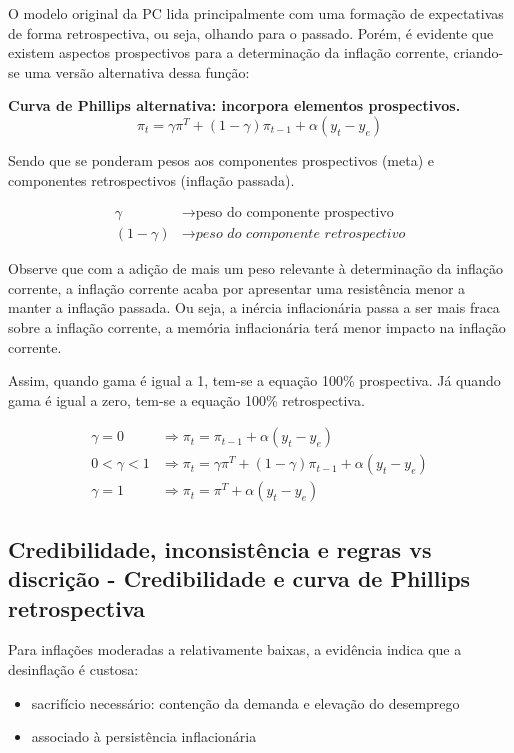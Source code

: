 \documentclass[a4paper,12pt]{article}[abntex2]
\begin{document}
O modelo original da PC lida principalmente com uma formação de expectativas de forma retrospectiva, ou seja, olhando para o passado. Porém, é evidente que existem aspectos prospectivos para a determinação da inflação corrente, criando-se uma versão alternativa dessa função:

\textbf{Curva de Phillips alternativa: incorpora elementos prospectivos.}
\begin{equation}
\pi_t = \gamma \pi^T + (1 - \gamma)\pi_{t-1} + \alpha (y_t - y_e)
\end{equation}

Sendo que se ponderam pesos aos componentes prospectivos (meta) e componentes retrospectivos (inflação passada).

\begin{align*}
\gamma &\rightarrow \text{peso do componente prospectivo} \\
(1 - \gamma) &\rightarrow \textit{peso do componente retrospectivo}
\end{align*}

Observe que com a adição de mais um peso relevante à determinação da inflação corrente, a inflação corrente acaba por apresentar uma resistência menor a manter a inflação passada. Ou seja, a inércia inflacionária passa a ser mais fraca sobre a inflação corrente, a memória inflacionária terá menor impacto na inflação corrente.

Assim, quando gama é igual a 1, tem-se a equação 100\% prospectiva. Já quando gama é igual a zero, tem-se a equação 100\% retrospectiva.

\begin{align*}
\gamma = 0 &\Rightarrow \pi_t = \pi_{t-1} + \alpha (y_t - y_e) \\
0 < \gamma < 1 &\Rightarrow \pi_t = \gamma \pi^T + (1 - \gamma)\pi_{t-1} + \alpha (y_t - y_e) \\
\gamma = 1 &\Rightarrow \pi_t = \pi^T + \alpha (y_t - y_e)
\end{align*}

\subsection{\textbf{Credibilidade, inconsistência e regras vs discrição - Credibilidade e curva de Phillips retrospectiva}}

Para inflações moderadas a relativamente baixas, a evidência indica que a desinflação é custosa:

\begin{itemize}
    \item  sacrifício necessário: contenção da demanda e elevação do desemprego
    \item  associado à persistência inflacionária
\end{itemize}
\end{document}
